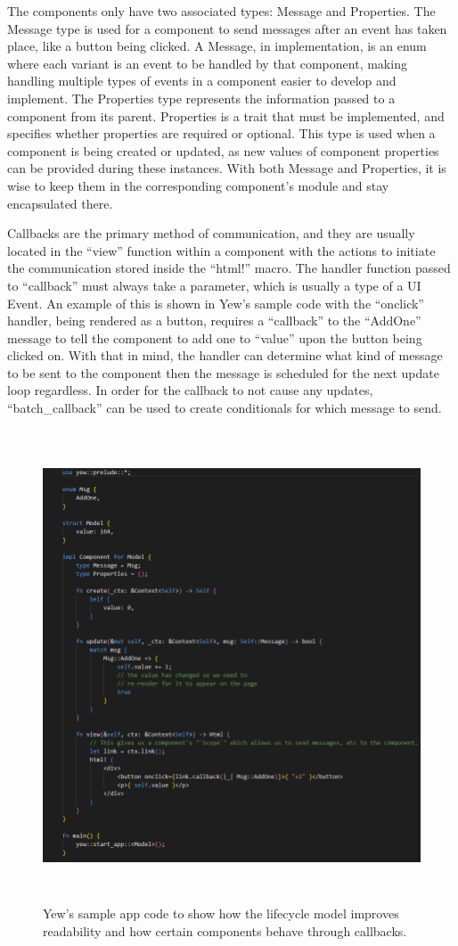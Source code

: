 \documentclass[
    paper=letter,
    parskip=half,
    fontsize=12pt,
    titlepage=firstiscover,
    toc=bibliography,
    numbers=endperiod
]{scrartcl}
\begin{document}
The components only have two associated types: Message and Properties.
The Message type is used for a component to send messages after an event
has taken place, like a button being clicked. A Message, in
implementation, is an enum where each variant is an event to be handled
by that component, making handling multiple types of events in a
component easier to develop and implement. The Properties type
represents the information passed to a component from its parent.
Properties is a trait that must be implemented, and specifies whether
properties are required or optional. This type is used when a component
is being created or updated, as new values of component properties can
be provided during these instances. With both Message and Properties, it
is wise to keep them in the corresponding component's module and stay
encapsulated there.

Callbacks are the primary method of communication, and they are usually
located in the ``view'' function within a component with the actions to
initiate the communication stored inside the ``html!'' macro. The
handler function passed to ``callback'' must always take a parameter,
which is usually a type of a UI Event. An example of this is shown in Yew's sample code with the ``onclick'' handler,
being rendered as a button, requires a ``callback'' to the ``AddOne'' message to
tell the component to add one to ``value'' upon the button being clicked on.  With that in mind, the handler can
determine what kind of message to be sent to the component then the
message is scheduled for the next update loop regardless. In order for
the callback to not cause any updates, ``batch\_callback'' can be used
to create conditionals for which message to send.

\begin{figure}[H]
    \includegraphics[height=14cm]{yew-sample-code}
    \caption{Yew's sample app code to show how the lifecycle model improves readability and how certain components behave through callbacks.}
\end{figure}
\end{document}
